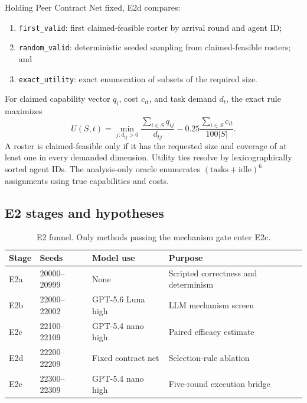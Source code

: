 \documentclass[11pt]{article}
\newcommand{\code}[1]{\texttt{#1}}
\begin{document}
Holding Peer Contract Net fixed, E2d compares:

\begin{enumerate}
  \item \code{first\_valid}: first claimed-feasible roster by arrival round and
  agent ID;
  \item \code{random\_valid}: deterministic seeded sampling from
  claimed-feasible rosters; and
  \item \code{exact\_utility}: exact enumeration of subsets of the required
  size.
\end{enumerate}

For claimed capability vector $q_i$, cost $c_{it}$, and task demand $d_t$,
the exact rule maximizes
\[
U(S,t)=
\min_{j:d_{tj}>0}
\frac{\sum_{i\in S}q_{ij}}{d_{tj}}
-
0.25\frac{\sum_{i\in S}c_{it}}{100|S|}.
\]
A roster is claimed-feasible only if it has the requested size and coverage of
at least one in every demanded dimension.  Utility ties resolve by
lexicographically sorted agent IDs.  The analysis-only oracle enumerates
\((\text{tasks}+\text{idle})^6\) assignments using true capabilities and costs.

\subsection{E2 stages and hypotheses}

\begin{table}[ht]
\centering
\small
\begin{tabular}{@{}llll@{}}
\toprule
Stage & Seeds & Model use & Purpose\\
\midrule
E2a & 20000--20999 & None & Scripted correctness and determinism\\
E2b & 22000--22002 & GPT-5.6 Luna high & LLM mechanism screen\\
E2c & 22100--22109 & GPT-5.4 nano high & Paired efficacy estimate\\
E2d & 22200--22209 & Fixed contract net & Selection-rule ablation\\
E2e & 22300--22309 & GPT-5.4 nano high & Five-round execution bridge\\
\bottomrule
\end{tabular}
\caption{E2 funnel.  Only methods passing the mechanism gate enter E2c.}
\label{tab:e2-design}
\end{table}
\end{document}
